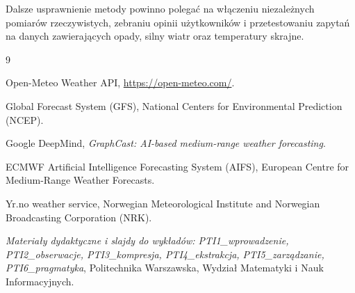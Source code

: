 \documentclass[a4paper,12pt]{article}
\begin{document}
\noindent
Dalsze usprawnienie metody powinno polegać na włączeniu niezależnych pomiarów
rzeczywistych, zebraniu opinii użytkowników i przetestowaniu zapytań na danych
zawierających opady, silny wiatr oraz temperatury skrajne.

\begin{thebibliography}{9}

Open-Meteo Weather API, \url{https://open-meteo.com/}.

Global Forecast System (GFS), National Centers for Environmental Prediction (NCEP).

Google DeepMind, \textit{GraphCast: AI-based medium-range weather forecasting}.

ECMWF Artificial Intelligence Forecasting System (AIFS), European Centre for Medium-Range Weather Forecasts.

Yr.no weather service, Norwegian Meteorological Institute and Norwegian Broadcasting Corporation (NRK).

\textit{Materiały dydaktyczne i slajdy do wykładów: PTI1\_wprowadzenie, PTI2\_obserwacje, PTI3\_kompresja, PTI4\_ekstrakcja, PTI5\_zarządzanie, PTI6\_pragmatyka}, Politechnika Warszawska, Wydział Matematyki i Nauk Informacyjnych.

\end{thebibliography}
\end{document}
